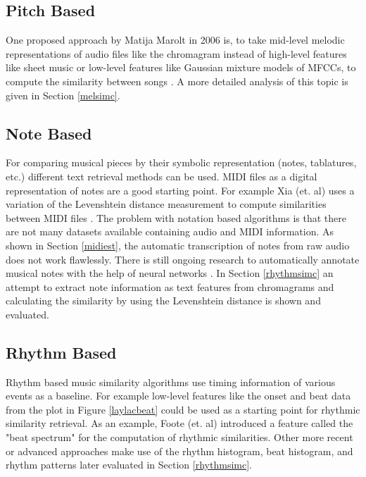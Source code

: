 \subsection{Pitch Based}

One proposed approach by Matija Marolt in 2006 is, to take mid-level melodic representations of audio files like the chromagram instead of high-level features like sheet music or low-level features like Gaussian mixture models of MFCCs, to compute the similarity between songs \cite{pitch1}. A more detailed analysis of this topic is given in Section \ref{melsimc}.

\subsection{Note Based}

For comparing musical pieces by their symbolic representation (notes, tablatures, etc.) different text retrieval methods can be used. MIDI files as a digital representation of notes are a good starting point. For example Xia (et. al) uses a variation of the Levenshtein distance measurement to compute similarities between MIDI files \cite{chroma4}. 
The problem with notation based algorithms is that there are not many datasets available containing audio and MIDI information. As shown in Section \ref{midiest}, the automatic transcription of notes from raw audio does not work flawlessly. There is still ongoing research to automatically annotate musical notes with the help of neural networks \cite{crepe1}.
In Section \ref{rhythmsimc} an attempt to extract note information as text features from chromagrams and calculating the similarity by using the Levenshtein distance is shown and evaluated.

\subsection{Rhythm Based}

Rhythm based music similarity algorithms use timing information of various events as a baseline. For example low-level features like the onset and beat data from the plot in Figure \ref{laylacbeat} could be used as a starting point for rhythmic similarity retrieval. As an example, Foote (et. al) introduced a feature called the "beat spectrum" for the computation of rhythmic similarities. Other more recent or advanced approaches make use of the rhythm histogram, beat histogram, and rhythm patterns later evaluated in Section \ref{rhythmsimc}.


